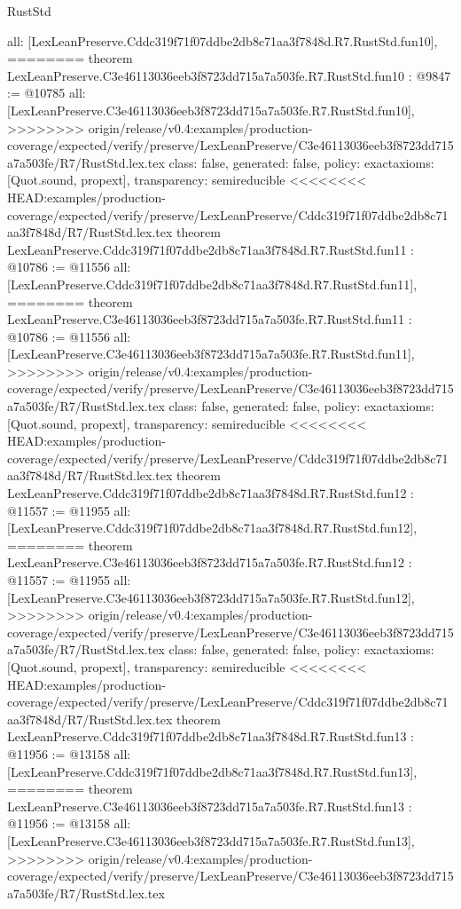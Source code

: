 \begin{lexlean}{RustStd}
\begin{coremodule}
{\begin{coremodule}
{{{{{{{{{{{{{  all: [LexLeanPreserve.Cddc319f71f07ddbe2db8c71aa3f7848d.R7.RustStd.fun10],
========
theorem LexLeanPreserve.C3e46113036eeb3f8723dd715a7a503fe.R7.RustStd.fun10 : @9847 := @10785 {
  all: [LexLeanPreserve.C3e46113036eeb3f8723dd715a7a503fe.R7.RustStd.fun10],
>>>>>>>> origin/release/v0.4:examples/production-coverage/expected/verify/preserve/LexLeanPreserve/C3e46113036eeb3f8723dd715a7a503fe/R7/RustStd.lex.tex
  class: false,
  generated: false,
  policy: exact{axioms: [Quot.sound, propext]},
  transparency: semireducible
}
<<<<<<<< HEAD:examples/production-coverage/expected/verify/preserve/LexLeanPreserve/Cddc319f71f07ddbe2db8c71aa3f7848d/R7/RustStd.lex.tex
theorem LexLeanPreserve.Cddc319f71f07ddbe2db8c71aa3f7848d.R7.RustStd.fun11 : @10786 := @11556 {
  all: [LexLeanPreserve.Cddc319f71f07ddbe2db8c71aa3f7848d.R7.RustStd.fun11],
========
theorem LexLeanPreserve.C3e46113036eeb3f8723dd715a7a503fe.R7.RustStd.fun11 : @10786 := @11556 {
  all: [LexLeanPreserve.C3e46113036eeb3f8723dd715a7a503fe.R7.RustStd.fun11],
>>>>>>>> origin/release/v0.4:examples/production-coverage/expected/verify/preserve/LexLeanPreserve/C3e46113036eeb3f8723dd715a7a503fe/R7/RustStd.lex.tex
  class: false,
  generated: false,
  policy: exact{axioms: [Quot.sound, propext]},
  transparency: semireducible
}
<<<<<<<< HEAD:examples/production-coverage/expected/verify/preserve/LexLeanPreserve/Cddc319f71f07ddbe2db8c71aa3f7848d/R7/RustStd.lex.tex
theorem LexLeanPreserve.Cddc319f71f07ddbe2db8c71aa3f7848d.R7.RustStd.fun12 : @11557 := @11955 {
  all: [LexLeanPreserve.Cddc319f71f07ddbe2db8c71aa3f7848d.R7.RustStd.fun12],
========
theorem LexLeanPreserve.C3e46113036eeb3f8723dd715a7a503fe.R7.RustStd.fun12 : @11557 := @11955 {
  all: [LexLeanPreserve.C3e46113036eeb3f8723dd715a7a503fe.R7.RustStd.fun12],
>>>>>>>> origin/release/v0.4:examples/production-coverage/expected/verify/preserve/LexLeanPreserve/C3e46113036eeb3f8723dd715a7a503fe/R7/RustStd.lex.tex
  class: false,
  generated: false,
  policy: exact{axioms: [Quot.sound, propext]},
  transparency: semireducible
}
<<<<<<<< HEAD:examples/production-coverage/expected/verify/preserve/LexLeanPreserve/Cddc319f71f07ddbe2db8c71aa3f7848d/R7/RustStd.lex.tex
theorem LexLeanPreserve.Cddc319f71f07ddbe2db8c71aa3f7848d.R7.RustStd.fun13 : @11956 := @13158 {
  all: [LexLeanPreserve.Cddc319f71f07ddbe2db8c71aa3f7848d.R7.RustStd.fun13],
========
theorem LexLeanPreserve.C3e46113036eeb3f8723dd715a7a503fe.R7.RustStd.fun13 : @11956 := @13158 {
  all: [LexLeanPreserve.C3e46113036eeb3f8723dd715a7a503fe.R7.RustStd.fun13],
>>>>>>>> origin/release/v0.4:examples/production-coverage/expected/verify/preserve/LexLeanPreserve/C3e46113036eeb3f8723dd715a7a503fe/R7/RustStd.lex.tex
}}}}}}}}}}}}}}}}}
\end{coremodule}}
\end{coremodule}
\end{lexlean}
